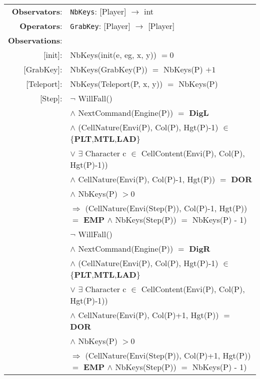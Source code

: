 \documentclass[8pt]{article}
\begin{document}
{\small
  \begin{longtable}{rl}
    \textbf{Observators}:& \texttt{NbKeys}: \textrm{[Player]} $\rightarrow$ \textrm{int}\\
    \textbf{Operators}: & \texttt{GrabKey}: \textrm{[Player]} $\rightarrow$ \textrm{[Player]} \\
    \textbf{Observations}:&\\
    \textrm{[init]}:& \textrm{NbKeys(init(e, eg, x, y))} $= 0$\\
    \textrm{[GrabKey]}:& \textrm{NbKeys(GrabKey(P))} $=$ \textrm{NbKeys(P)} $+ 1$ \\
    \textrm{[Teleport]}:& \textrm{NbKeys(Teleport(P, x, y))} $=$ \textrm{NbKeys(P)}\\
    \textrm{[Step]}:& $\neg$ \textrm{WillFall()}\\
    & \quad\quad $\land$ \textrm{NextCommand(Engine(P))} $=$ \textbf{DigL}\\
    & \quad\quad $\land$ (\textrm{CellNature(Envi(P), Col(P), Hgt(P)-1)} $\in$ \{\textbf{PLT},\textbf{MTL},\textbf{LAD}\}\\
    & \quad\quad\quad\quad $\lor$ $\exists$ \textrm{Character} c $\in$ \textrm{CellContent(Envi(P), Col(P), Hgt(P)-1)})\\
    & \quad\quad $\land$ \textrm{CellNature(Envi(P), Col(P)-1, Hgt(P))} $=$ \textbf{DOR}\\
    & \quad\quad $\land$ \textrm{NbKeys(P)} $> 0$\\
    & \quad\quad $\Rightarrow$ (\textrm{CellNature(Envi(Step(P)), Col(P)-1, Hgt(P))} $=$ \textbf{EMP} $\land$ \textrm{NbKeys(Step(P))} $=$ \textrm{NbKeys(P)} - 1)\\
    & $\neg$ \textrm{WillFall()}\\
    & \quad\quad $\land$ \textrm{NextCommand(Engine(P))} $=$ \textbf{DigR}\\
    & \quad\quad $\land$ (\textrm{CellNature(Envi(P), Col(P), Hgt(P)-1)} $\in$ \{\textbf{PLT},\textbf{MTL},\textbf{LAD}\}\\
    & \quad\quad\quad\quad $\lor$ $\exists$ \textrm{Character} c $\in$ \textrm{CellContent(Envi(P), Col(P), Hgt(P)-1)})\\
    & \quad\quad $\land$ \textrm{CellNature(Envi(P), Col(P)+1, Hgt(P))} $=$ \textbf{DOR}\\
    & \quad\quad $\land$ \textrm{NbKeys(P)} $> 0$\\
    & \quad\quad $\Rightarrow$ (\textrm{CellNature(Envi(Step(P)), Col(P)+1, Hgt(P))} $=$ \textbf{EMP} $\land$ \textrm{NbKeys(Step(P))} $=$ \textrm{NbKeys(P)} - 1)\\
  \end{longtable}}
\end{document}
